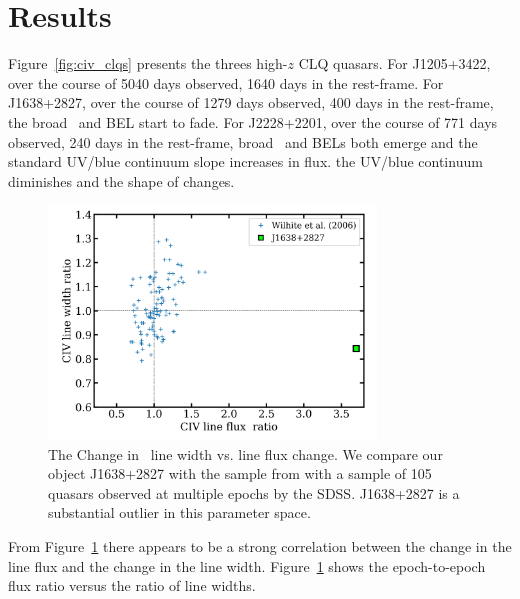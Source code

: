 \documentclass[a4paper,fleqn,usenatbib]{mnras}
\begin{document}
\section{Results}
Figure~\ref{fig:civ_clqs} presents the threes high-$z$ CLQ quasars. 
For J1205+3422, over the course of 5040 days observed, 1640 days in the
rest-frame. 
For J1638+2827, over the course of 1279 days observed, 400 days in the
rest-frame, the broad \civ\ and \ciii BEL start to fade.  For
J2228+2201, over the course of 771 days observed, 240 days in the
rest-frame, broad \civ\ and \ciii BELs both emerge and the standard
UV/blue continuum slope increases in flux.  the UV/blue continuum
diminishes and the shape of \lya changes.



\begin{figure}
  \centering
  \includegraphics[width=8.7cm, trim=0.2cm 0.2cm 0.2cm 0.2cm, clip]
  {figures/Wilhite_2006_Fig2_redux_20190926.png}
   \vspace{-12pt}
  \caption[]{The Change in \civ\ line width vs. line flux change. 
We compare our object J1638+2827 with the sample 
from \citet{Wilhite2006} with a sample of 105 quasars observed at
multiple epochs by the SDSS. J1638+2827 is a substantial outlier 
in this parameter space.}
  \label{fig:Wilhite2006_comparison}
\end{figure}
From Figure~\ref{fig:Wilhite2006_comparison} there appears to be a
strong correlation between the change in the line flux and the change
in the line width.  Figure~\ref{fig:Wilhite2006_comparison} shows the
epoch-to-epoch flux ratio versus the ratio of line widths.
\end{document}
